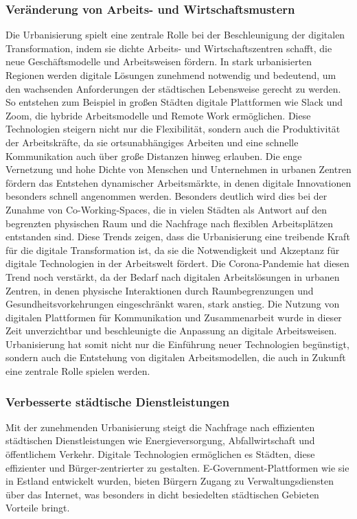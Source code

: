 \documentclass[conference,compsoc,final,a4paper, onecolumn, 11pt]{IEEEtran}
\begin{document}
\subsubsection{Veränderung von Arbeits- und Wirtschaftsmustern}
Die Urbanisierung spielt eine zentrale Rolle bei der Beschleunigung der digitalen Transformation, indem sie dichte Arbeits- und Wirtschaftszentren schafft, die neue Geschäftsmodelle und Arbeitsweisen fördern. 
In stark urbanisierten Regionen werden digitale Lösungen zunehmend notwendig und bedeutend, um den wachsenden Anforderungen der städtischen Lebensweise gerecht zu werden. 
So entstehen zum Beispiel in großen Städten digitale Plattformen wie Slack und Zoom, die hybride Arbeitsmodelle und Remote Work ermöglichen. 
Diese Technologien steigern nicht nur die Flexibilität, sondern auch die Produktivität der Arbeitskräfte, da sie ortsunabhängiges Arbeiten und eine schnelle Kommunikation auch über große Distanzen hinweg erlauben.
Die enge Vernetzung und hohe Dichte von Menschen und Unternehmen in urbanen Zentren fördern das Entstehen dynamischer Arbeitsmärkte, in denen digitale Innovationen besonders schnell angenommen werden. 
Besonders deutlich wird dies bei der Zunahme von Co-Working-Spaces, die in vielen Städten als Antwort auf den begrenzten physischen Raum und die Nachfrage nach flexiblen Arbeitsplätzen entstanden sind. 
Diese Trends zeigen, dass die Urbanisierung eine treibende Kraft für die digitale Transformation ist, da sie die Notwendigkeit und Akzeptanz für digitale Technologien in der Arbeitswelt fördert.
Die Corona-Pandemie hat diesen Trend noch verstärkt, da der Bedarf nach digitalen Arbeitslösungen in urbanen Zentren, in denen physische Interaktionen durch Raumbegrenzungen und Gesundheitsvorkehrungen eingeschränkt waren, stark anstieg. 
Die Nutzung von digitalen Plattformen für Kommunikation und Zusammenarbeit wurde in dieser Zeit unverzichtbar und beschleunigte die Anpassung an digitale Arbeitsweisen. 
Urbanisierung hat somit nicht nur die Einführung neuer Technologien begünstigt, sondern auch die Entstehung von digitalen Arbeitsmodellen, die auch in Zukunft eine zentrale Rolle spielen werden. \autocite{sustainability_digital_2023}


\subsubsection{ Verbesserte städtische Dienstleistungen}
Mit der zunehmenden Urbanisierung steigt die Nachfrage nach effizienten städtischen Dienstleistungen wie Energieversorgung, Abfallwirtschaft und öffentlichem Verkehr. 
Digitale Technologien ermöglichen es Städten, diese effizienter und Bürger-zentrierter zu gestalten. 
E-Government-Plattformen wie sie in Estland entwickelt wurden, bieten Bürgern Zugang zu Verwaltungsdiensten über das Internet, was besonders in dicht besiedelten städtischen Gebieten Vorteile bringt. \autocite{un_habitat_world_2022}
\end{document}
